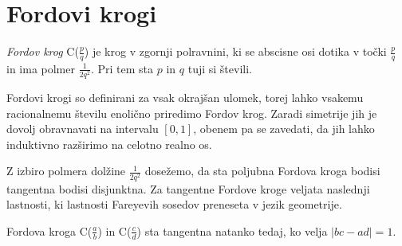 \documentclass[mat1]{fmfdelo}
\begin{document}
%
\section{Fordovi krogi}

\begin{definicija}
\emph{Fordov krog} C($\frac{p}{q}$) je krog v zgornji polravnini, ki se abscisne osi dotika v točki $\frac{p}{q}$ in ima polmer $\frac{1}{2q^2}$. Pri tem sta $p$ in $q$ tuji si števili. 
\end{definicija}

Fordovi krogi so definirani za vsak okrajšan ulomek, torej lahko vsakemu racionalnemu številu enolično priredimo Fordov krog. Zaradi simetrije jih je dovolj obravnavati na intervalu $[0,1]$, obenem pa se zavedati, da jih lahko induktivno razširimo na celotno realno os.

Z izbiro polmera dolžine $\frac{1}{2q^2}$ dosežemo, da sta poljubna Fordova kroga bodisi tangentna bodisi disjunktna. Za tangentne Fordove kroge veljata naslednji lastnosti, ki lastnosti Fareyevih sosedov preneseta v jezik geometrije. 

\begin{trditev}
\label{trd:FordTangentnost}
Fordova kroga C($\frac{a}{b}$) in C($\frac{c}{d}$) sta tangentna natanko tedaj, ko velja \( |bc-ad|=1. \)
\end{trditev}
\end{document}
